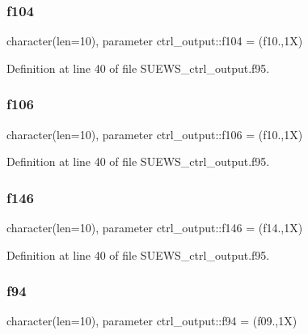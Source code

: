 \subsubsection{\texorpdfstring{f104}{f104}}
{\footnotesize\ttfamily character(len=10), parameter ctrl\+\_\+output\+::f104 = \textquotesingle{}(f10.,1\+X)\textquotesingle{}}



Definition at line 40 of file S\+U\+E\+W\+S\+\_\+ctrl\+\_\+output.\+f95.

\mbox{\label{namespacectrl__output_a191786067cffb2dc5dcfcafb12b2ead6}} 
\subsubsection{\texorpdfstring{f106}{f106}}
{\footnotesize\ttfamily character(len=10), parameter ctrl\+\_\+output\+::f106 = \textquotesingle{}(f10.,1\+X)\textquotesingle{}}



Definition at line 40 of file S\+U\+E\+W\+S\+\_\+ctrl\+\_\+output.\+f95.

\mbox{\label{namespacectrl__output_a524b25246e690cfbc8f75fe72938fb06}} 
\subsubsection{\texorpdfstring{f146}{f146}}
{\footnotesize\ttfamily character(len=10), parameter ctrl\+\_\+output\+::f146 = \textquotesingle{}(f14.,1\+X)\textquotesingle{}}



Definition at line 40 of file S\+U\+E\+W\+S\+\_\+ctrl\+\_\+output.\+f95.

\mbox{\label{namespacectrl__output_a11f0b66275fc65047967ff8b2050ad25}} 
\subsubsection{\texorpdfstring{f94}{f94}}
{\footnotesize\ttfamily character(len=10), parameter ctrl\+\_\+output\+::f94 = \textquotesingle{}(f09.,1\+X)\textquotesingle{}}



